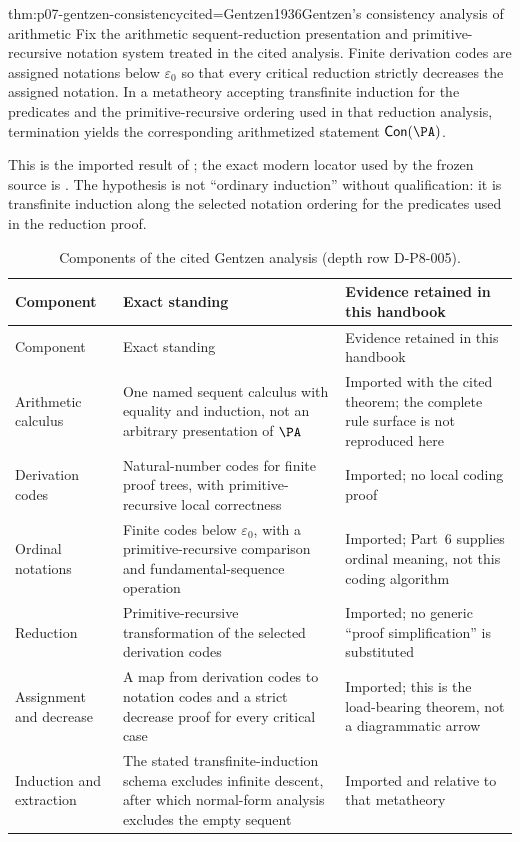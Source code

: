 \begin{hbtheorem}{thm:p07-gentzen-consistency}{cited=Gentzen1936}{Gentzen's consistency analysis of arithmetic}
Fix the arithmetic sequent-reduction presentation and primitive-recursive
notation system treated in the cited analysis.  Finite derivation codes are
assigned notations below \(\varepsilon_0\) so that every critical reduction
strictly decreases the assigned notation.  In a metatheory accepting
transfinite induction for the predicates and the primitive-recursive ordering
used in that reduction analysis, termination yields the corresponding
arithmetized statement \(\mathsf{Con}(\PA)\).
\end{hbtheorem}

This is the imported result of \cite{Gentzen1936,Gentzen1938}; the exact
modern locator used by the frozen source is
\cite[Chapter~10, especially Sections~10.1--10.4,
pp.~318--337]{TroelstraSchwichtenberg2000}.  The hypothesis is not ``ordinary
induction'' without qualification: it is transfinite induction along the
selected notation ordering for the predicates used in the reduction proof.

\begingroup\small
\begin{longtable}{@{}p{}p{}p{}@{}}
\caption{Components of the cited Gentzen analysis (depth row D-P8-005).}
\label{tab:p07-gentzen-components}\\
\toprule
Component & Exact standing & Evidence retained in this handbook \\
\midrule
\endfirsthead
\toprule
Component & Exact standing & Evidence retained in this handbook \\
\midrule
\endhead
Arithmetic calculus & One named sequent calculus with equality and induction,
not an arbitrary presentation of \(\PA\) & Imported with the cited theorem;
the complete rule surface is not reproduced here \\
Derivation codes & Natural-number codes for finite proof trees, with
primitive-recursive local correctness & Imported; no local coding proof \\
Ordinal notations & Finite codes below \(\varepsilon_0\), with a
primitive-recursive comparison and fundamental-sequence operation & Imported;
Part~6 supplies ordinal meaning, not this coding algorithm \\
Reduction & Primitive-recursive transformation of the selected derivation
codes & Imported; no generic ``proof simplification'' is substituted \\
Assignment and decrease & A map from derivation codes to notation codes and a
strict decrease proof for every critical case & Imported; this is the
load-bearing theorem, not a diagrammatic arrow \\
Induction and extraction & The stated transfinite-induction schema excludes
infinite descent, after which normal-form analysis excludes the empty sequent
& Imported and relative to that metatheory \\
\bottomrule
\end{longtable}
\endgroup

